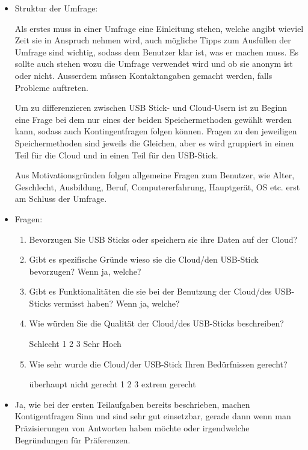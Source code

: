 \begin{itemize}

    \item Struktur der Umfrage:

    Als erstes muss in einer Umfrage eine Einleitung stehen, welche angibt wieviel
    Zeit sie in Anspruch nehmen wird, auch mögliche Tipps zum Ausfüllen der Umfrage sind wichtig,
    sodass dem Benutzer klar ist, was er machen muss. Es sollte auch stehen wozu die Umfrage verwendet wird
    und ob sie anonym ist oder nicht. Ausserdem müssen Kontaktangaben gemacht werden,
    falls Probleme auftreten. 

    Um zu differenzieren zwischen USB Stick- und Cloud-Usern ist zu Beginn eine Frage bei dem nur eines
    der beiden Speichermethoden gewählt werden kann, sodass auch Kontingentfragen folgen können.
    Fragen zu den jeweiligen Speichermethoden sind jeweils die Gleichen, aber es wird
    gruppiert in einen Teil für die Cloud und in einen Teil für den USB-Stick.

    Aus Motivationsgründen folgen allgemeine Fragen zum Benutzer, wie Alter, Geschlecht, 
    Ausbildung, Beruf, Computererfahrung, Hauptgerät, OS etc. erst am Schluss der Umfrage.

    \item Fragen:
    
    \begin{enumerate}[label=\arabic*)]
        \item Bevorzugen Sie USB Sticks oder speichern sie ihre Daten auf der Cloud?
        \item Gibt es spezifische Gründe wieso sie die Cloud/den USB-Stick bevorzugen? Wenn ja, welche?
        \item Gibt es Funktionalitäten die sie bei der Benutzung der Cloud/des USB-Sticks vermisst haben? Wenn ja, welche?
        \item Wie würden Sie die Qualität der Cloud/des USB-Sticks beschreiben?

            Schlecht    1   2   3   Sehr Hoch
        \item Wie sehr wurde die Cloud/der USB-Stick Ihren Bedürfnissen gerecht?

            überhaupt nicht gerecht     1   2   3   extrem gerecht

    \end{enumerate}

    \item Ja, wie bei der ersten Teilaufgaben bereits beschrieben, machen
    Kontigentfragen Sinn und sind sehr gut einsetzbar, gerade dann wenn man Präzisierungen von Antworten 
    haben möchte oder irgendwelche Begründungen für Präferenzen.



\end{itemize}

